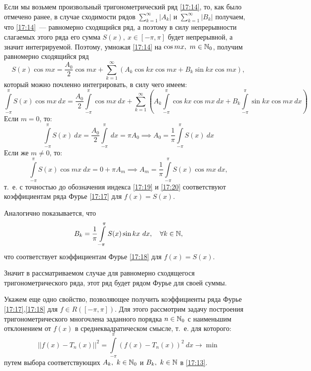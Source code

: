 \documentclass[../../main.tex]{subfiles}
\begin{document}
Если мы возьмем произвольный 
тригонометрический ряд \eqref{17:14}, то, как было отмечено ранее, в случае 
сходимости рядов
$\sum\limits_{k=1}^{\infty} \left| A_k \right|$ и $\sum\limits_{k=1}^{\infty} 
\left| B_k \right|$ получаем, что
\eqref{17:14}~--- равномерно сходящийся ряд, а поэтому в силу непрерывности 
слагаемых этого ряда его сумма $S(x),\ x\in\left[ -\pi,\pi \right] $ будет 
непрерывной, а значит интегрируемой.
Поэтому, умножая \eqref{17:14} на $\cos{mx},\ m \in \mathbb{N}_0$, получим равномерно 
сходящийся ряд
\[  S(x) \cos{mx} =  \frac{A_0}{2} \cos{mx} + \sum_{k=1}^{\infty}  \left( A_k 
\cos{kx} \cos{mx} + B_k \sin{kx} \cos{mx} \right), \]
который можно почленно интегрировать, в силу чего имеем:
\[  \int\limits_{-\pi}^{\pi} S(x) \cos{mx} \ dx = 
\frac{A_0}{2}\int\limits_{-\pi}^{\pi} \cos{mx} \ dx + \sum_{k=1}^{\infty}  
\left( A_k \int\limits_{-\pi}^{\pi} \cos{kx} \cos{mx} \ dx + B_k 
\int\limits_{-\pi}^{\pi} \sin{kx} \cos{mx} \ dx \right)  \]
Если $m=0$, то:
\begin{equation}
\label{17:19}
\int\limits_{-\pi}^{\pi} S(x) \ dx = \frac{A_0}{2}\int\limits_{-\pi}^{\pi} \ 
dx  = \pi A_0  \implies A_0 = \frac{1}{\pi} \int\limits_{-\pi}^{\pi} S(x) \ dx
\end{equation}
Если же $m \ne 0$, то:
\begin{equation}
\label{17:20}
\int\limits_{-\pi}^{\pi} S(x) \cos{mx} \ dx = 0 + \pi A_m \implies A_m = 
\frac{1}{\pi} \int\limits_{-\pi}^{\pi} S(x) \cos{mx} \ dx,
\end{equation}
т.~е. с точностью до обозначения индекса \eqref{17:19} и \eqref{17:20} 
соответствуют коэффициентам ряда Фурье \eqref{17:17} для $f(x) = S(x)$.

Аналогично показывается, что
\begin{equation}
\label{17:21}
B_k = \frac{1}{\pi} \int\limits_{-\pi}^{\pi} S(x) \sin{kx} \ dx, \quad 
\forall k \in \mathbb{N},
\end{equation}
что соответствует коэффициентам Фурье \eqref{17:18} для $f(x) = S(x)$. 

Значит в рассматриваемом случае для равномерно сходящегося тригонометрического 
ряда, этот ряд будет рядом Фурье для своей суммы.

Укажем еще одно свойство, позволяющее получить коэффициенты ряда Фурье 
\eqref{17:17},\eqref{17:18} для $f \in R\left( \left[ -\pi,\pi\right]  
\right).$ Для этого рассмотрим задачу построения тригонометрического 
многочлена заданного порядка $n \in \mathbb{N}_0$ с наименьшим отклонением от $f(x)$ в 
среднеквадратическом смысле, т.~е. для которого:
\begin{equation}
\label{17:22}
\left|| f(x) -T_n(x) |\right| ^2 = \int \limits_{-\pi}^{\pi} \left( f(x) - 
T_n(x)\right)^2 \ dx \to \min
\end{equation}
путем выбора соответствующих $A_k,\ k \in \mathbb{N}_0$ и $B_k,\ k \in \mathbb{N}$ в 
\eqref{17:13}.
\end{document}
